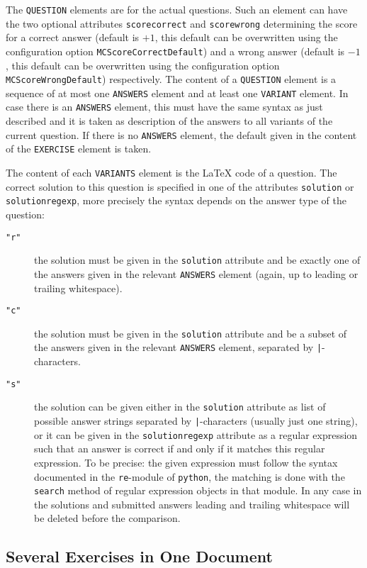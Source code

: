 \documentclass[12pt,openany,a4paper]{book}
\begin{document}
The \texttt{QUESTION} elements are for the actual questions. Such an element
can have the two optional attributes \texttt{scorecorrect} and 
\texttt{scorewrong} determining the score for a correct answer 
(default is $+1$, this default can be overwritten using the
configuration option \texttt{MCScoreCorrectDefault}) and a wrong answer 
(default is $-1$, this default can be overwritten using the
configuration option \texttt{MCScoreWrongDefault}) respectively.
The content of a \texttt{QUESTION} element
is a sequence of at most one \texttt{ANSWERS} element and at least one
\texttt{VARIANT} element. In case there is an \texttt{ANSWERS} element, this
must have the same syntax as just described and it is taken as description
of the answers to all variants of the current question. If there is no
\texttt{ANSWERS} element, the default given in the content of the
\texttt{EXERCISE} element is taken. 

The content of each \texttt{VARIANTS} element is the {\LaTeX} code of a
question. The correct  solution to this question is specified in one of the
attributes \texttt{solution} or \texttt{solutionregexp}, more precisely the
syntax depends on the answer type of the question:
\begin{description}
\item[\texttt{"r"}] the solution must be given in the \texttt{solution} 
attribute and be exactly one of the answers given in
the relevant \texttt{ANSWERS} element (again, up to leading or trailing
whitespace).
\item[\texttt{"c"}] the solution must be given in the \texttt{solution}
attribute and be a subset of the answers given in the relevant
\texttt{ANSWERS} element, separated by \verb+|+-characters.
\item[\texttt{"s"}] the solution can be given either in the
\texttt{solution} attribute as list of possible answer strings separated by 
\verb+|+-characters (usually just one string), or it can be given in the 
\texttt{solutionregexp} attribute as a regular expression such that an
answer is correct if and only if it matches this regular expression. To be
precise: the given expression must follow the syntax documented in the
\texttt{re}-module of \texttt{python}, the matching is done with the
\texttt{search} method of regular expression objects in that module.
In any case in the solutions and submitted answers leading and trailing
whitespace will be deleted before the comparison.
\end{description}

\subsection*{Several Exercises in One Document}
\end{document}
